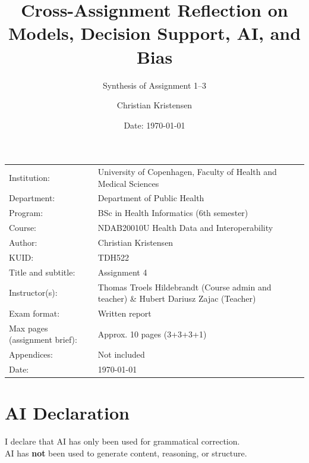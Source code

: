 \documentclass[12pt]{article}
\author{Christian Kristensen}
\title{Cross-Assignment Reflection on Models, Decision Support, AI, and Bias}
\subtitle{Synthesis of Assignment 1--3}
\date{Date: \today}
\begin{document}
\maketitle

\onehalfspacing

\begin{center}
\def\arraystretch{1.5}
\begin{tabularx}{\textwidth}{l X}
Institution: & University of Copenhagen, Faculty of Health and Medical Sciences \\
Department: & Department of Public Health \\
Program: & BSc in Health Informatics (6th semester) \\
Course: & NDAB20010U Health Data and Interoperability \\
Author: & Christian Kristensen \\
KUID: & TDH522 \\
Title and subtitle: & Assignment 4 \\
Instructor(s): & Thomas Troels Hildebrandt (Course admin and teacher) \& Hubert Dariusz Zajac (Teacher) \\
Exam format: & Written report \\
Max pages (assignment brief): & Approx. 10 pages (3+3+3+1) \\
Appendices: & Not included \\
Date: & \today
\end{tabularx}
\end{center}

\section*{AI Declaration}
I declare that AI has only been used for grammatical correction.\\
AI has \textbf{not} been used to generate content, reasoning, or structure.
\newpage

\tableofcontents
\clearpage



\clearpage
\printbibliography[heading=bibintoc,title={References}]
\end{document}
